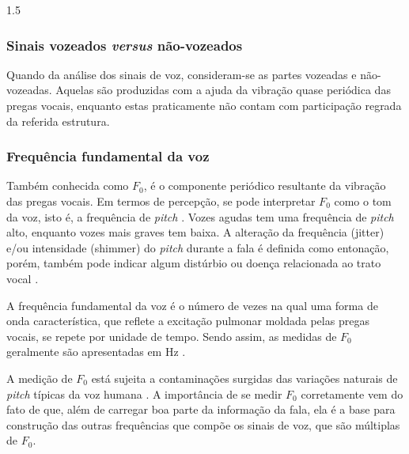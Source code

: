 \documentclass[a4paper,12pt,openright,oneside]{book}
\newenvironment{myenv}[1]
  {\begin{spacing}{#1}}
  {\end{spacing}}
\begin{document}
\begin{myenv}{1.5}
				\subsubsection{Sinais vozeados \textit{versus} não-vozeados}
				
					\par Quando da análise dos sinais de voz, consideram-se as partes vozeadas e não-vozeadas. Aquelas são produzidas com a ajuda da vibração quase periódica das pregas vocais, enquanto estas praticamente não contam com participação regrada da referida estrutura.
				
				\subsubsection{Frequência fundamental da voz}
					\par Também conhecida como $F_0$, é o componente periódico resultante da vibração das pregas vocais. Em termos de percepção, se pode interpretar $F_0$ como o tom da voz, isto é, a frequência de \textit{pitch} \cite{kremer2014eficiencia}. Vozes agudas tem uma frequência de \textit{pitch} alto, enquanto vozes mais graves tem baixa. A alteração da frequência (jitter) e/ou intensidade (shimmer) do \textit{pitch} durante a fala é definida como entonação,  porém, também pode indicar algum distúrbio ou doença relacionada ao trato vocal \cite{WERTZNER2005}.
					
					\par A frequência fundamental da voz é o número de vezes na qual uma forma de onda característica, que reflete a excitação pulmonar moldada pelas pregas vocais, se repete por unidade de tempo. Sendo assim, as medidas de $F_0$ geralmente são apresentadas em Hz \cite{freitas2013avaliaccao}.
					
					\par A medição de $F_0$ está sujeita a contaminações surgidas das variações naturais de \textit{pitch} típicas da voz humana \cite{freitas2013avaliaccao}. A importância de se medir $F_0$ corretamente vem do fato de que, além de carregar boa parte da informação da fala, ela é a base para construção das outras frequências que compõe os sinais de voz, que são múltiplas de $F_0$.
				

\end{myenv}
\end{document}
